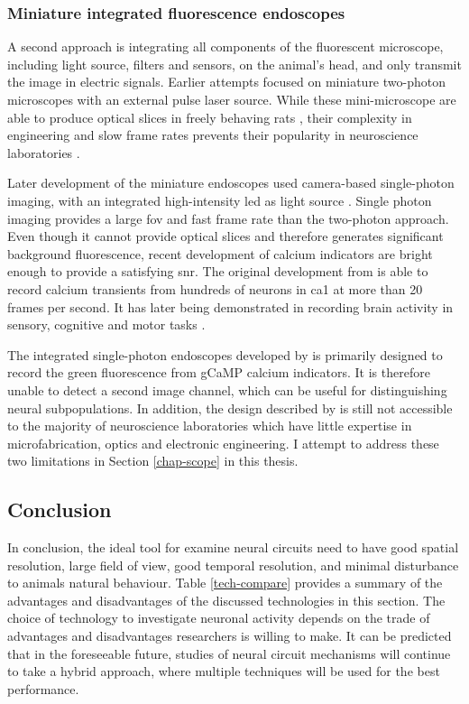 \subsubsection{Miniature integrated fluorescence endoscopes}
A second approach is integrating all components of the fluorescent microscope, including light source, filters and sensors, on the animal's head, and only transmit the image in electric signals. Earlier attempts focused on miniature two-photon microscopes with an external pulse laser source\citep{flusberg05, piyawattanametha09}. While these mini-microscope are able to produce optical slices in freely behaving rats \citep{sawinski09}, their complexity in engineering and slow frame rates prevents their popularity in neuroscience laboratories \citep{hamel15, yang17}.

Later development of the miniature endoscopes used camera-based single-photon imaging, with an integrated high-intensity \gls{led} as light source \citep{ghosh11}. Single photon imaging provides a large \gls{fov} and fast frame rate than the two-photon approach. Even though it cannot provide optical slices and therefore generates significant background fluorescence, recent development of calcium indicators are bright enough to provide a satisfying \gls{snr}. The original development from \citet{ghosh11} is able to record calcium transients from hundreds of neurons in \gls{ca1} at more than 20 frames per second. It has later being demonstrated in recording brain activity in sensory, cognitive and motor tasks \citep{ziv13}.

The integrated single-photon endoscopes developed by \citet{ghosh11} is primarily designed to record the green fluorescence from gCaMP calcium indicators. It is therefore unable to detect a second image channel, which can be useful for distinguishing neural subpopulations. In addition, the design described by \citet{ghosh11} is still not accessible to the majority of neuroscience laboratories which have little expertise in microfabrication, optics and electronic engineering. I attempt to address these two limitations in Section \ref{chap-scope} in this thesis. 

\subsection{Conclusion}

In conclusion, the ideal tool for examine neural circuits need to have good spatial resolution, large field of view, good temporal resolution, and minimal disturbance to animals natural behaviour. Table \ref{tech-compare} provides a summary of the advantages and disadvantages of the discussed technologies in this section. The choice of technology to investigate neuronal activity depends on the trade of advantages and disadvantages researchers is willing to make. It can be predicted that in the foreseeable future, studies of neural circuit mechanisms will continue to take a hybrid approach, where multiple techniques will be used for the best performance. 

